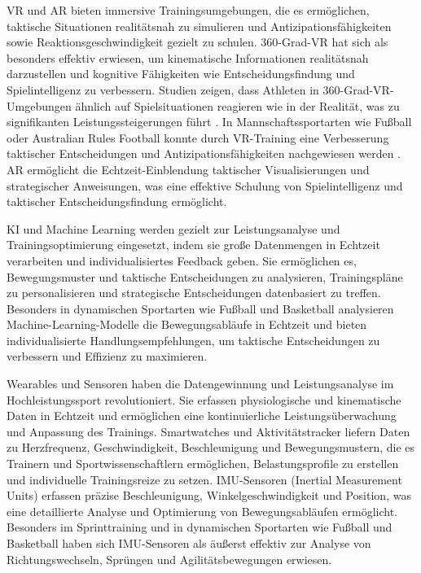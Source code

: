 \documentclass[
  number]{elsarticle}
\begin{document}
VR und AR bieten immersive Trainingsumgebungen, die es ermöglichen,
taktische Situationen realitätsnah zu simulieren und
Antizipationsfähigkeiten sowie Reaktionsgeschwindigkeit gezielt zu
schulen. 360-Grad-VR hat sich als besonders effektiv erwiesen, um
kinematische Informationen realitätsnah darzustellen und kognitive
Fähigkeiten wie Entscheidungsfindung und Spielintelligenz zu verbessern.
Studien zeigen, dass Athleten in 360-Grad-VR-Umgebungen ähnlich auf
Spielsituationen reagieren wie in der Realität, was zu signifikanten
Leistungssteigerungen führt \citep{sportsmedicine_ai}. In
Mannschaftssportarten wie Fußball oder Australian Rules Football konnte
durch VR-Training eine Verbesserung taktischer Entscheidungen und
Antizipationsfähigkeiten nachgewiesen werden \citep{sportsmedicine_ai}.
AR ermöglicht die Echtzeit-Einblendung taktischer Visualisierungen und
strategischer Anweisungen, was eine effektive Schulung von
Spielintelligenz und taktischer Entscheidungsfindung ermöglicht.
\citep{sportsmedicine_xr}

KI und Machine Learning werden gezielt zur Leistungsanalyse und
Trainingsoptimierung eingesetzt, indem sie große Datenmengen in Echtzeit
verarbeiten und individualisiertes Feedback geben. Sie ermöglichen es,
Bewegungsmuster und taktische Entscheidungen zu analysieren,
Trainingspläne zu personalisieren und strategische Entscheidungen
datenbasiert zu treffen. Besonders in dynamischen Sportarten wie Fußball
und Basketball analysieren Machine-Learning-Modelle die Bewegungsabläufe
in Echtzeit und bieten individualisierte Handlungsempfehlungen, um
taktische Entscheidungen zu verbessern und Effizienz zu maximieren.
\citep[pp.178-185]{memmert_sportinformatik}

Wearables und Sensoren haben die Datengewinnung und Leistungsanalyse im
Hochleistungssport revolutioniert. Sie erfassen physiologische und
kinematische Daten in Echtzeit und ermöglichen eine kontinuierliche
Leistungsüberwachung und Anpassung des Trainings. Smartwatches und
Aktivitätstracker liefern Daten zu Herzfrequenz, Geschwindigkeit,
Beschleunigung und Bewegungsmustern, die es Trainern und
Sportwissenschaftlern ermöglichen, Belastungsprofile zu erstellen und
individuelle Trainingsreize zu setzen. IMU-Sensoren (Inertial
Measurement Units) erfassen präzise Beschleunigung,
Winkelgeschwindigkeit und Position, was eine detaillierte Analyse und
Optimierung von Bewegungsabläufen ermöglicht. Besonders im
Sprinttraining und in dynamischen Sportarten wie Fußball und Basketball
haben sich IMU-Sensoren als äußerst effektiv zur Analyse von
Richtungswechseln, Sprüngen und Agilitätsbewegungen erwiesen.
\citep[pp.~435-447]{wearables_Käferböck}
\end{document}
